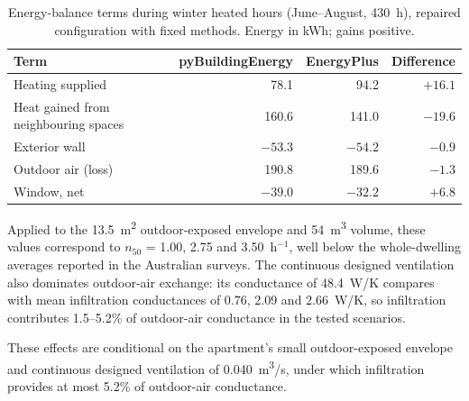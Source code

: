 \begin{table}[htbp]
\centering
\caption{Energy-balance terms during winter heated hours (June--August, 430~h),
repaired configuration with fixed methods. Energy in kWh; gains positive.}
\label{tab:winter-balance}
\begin{tabular}{lrrr}
\toprule
Term & pyBuildingEnergy & EnergyPlus & Difference \\
\midrule
Heating supplied                     &  78.1 &  94.2 & $+16.1$ \\
Heat gained from neighbouring spaces & 160.6 & 141.0 & $-19.6$ \\
Exterior wall                        & $-53.3$ & $-54.2$ & $-0.9$ \\
Outdoor air (loss)                   & 190.8 & 189.6 & $-1.3$ \\
Window, net                          & $-39.0$ & $-32.2$ & $+6.8$ \\
\bottomrule
\end{tabular}
\end{table}


Applied to the 13.5~m\textsuperscript{2} outdoor-exposed envelope and 54~m\textsuperscript{3}
volume, these values correspond to $n_{50}$ = 1.00, 2.75 and 3.50~h$^{-1}$,
well below the whole-dwelling averages reported in the Australian surveys.
The continuous designed ventilation also dominates outdoor-air exchange: its
conductance of 48.4~W/K compares with mean infiltration conductances of 0.76,
2.09 and 2.66~W/K, so infiltration contributes 1.5--5.2\% of outdoor-air
conductance in the tested scenarios.

These effects are conditional on the apartment's small outdoor-exposed
envelope and continuous designed ventilation of 0.040~m\textsuperscript{3}/s,
under which infiltration provides at most 5.2\% of outdoor-air conductance.


